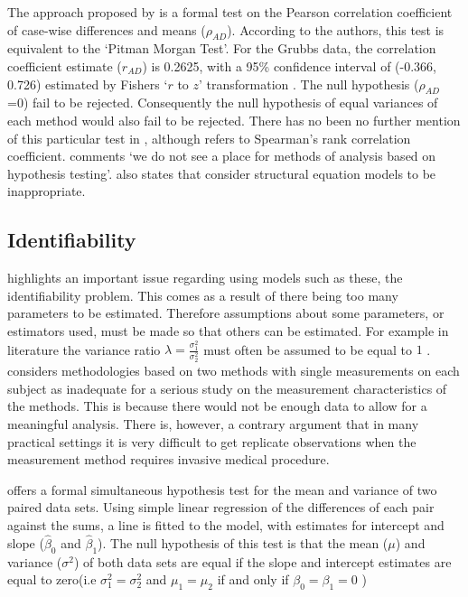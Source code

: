 \documentclass[Chap2main.tex]{subfiles}
\begin{document}
The approach proposed by \citet{BA83} is a formal test on the
Pearson correlation coefficient of case-wise differences and means
($\rho_{AD}$). According to the authors, this test is equivalent
to the `Pitman Morgan Test'. For the Grubbs data, the correlation
coefficient estimate ($r_{AD}$) is 0.2625, with a 95\% confidence
interval of (-0.366, 0.726) estimated by Fishers `$r$ to $z$'
transformation \citep*{Cohen}. The null hypothesis ($\rho_{AD}$ =0)
fail to be rejected. Consequently the null hypothesis of equal
variances of each method would also fail to be rejected. There has
no been no further mention of this particular test in
\citet{BA86}, although \citet{BA99} refers to Spearman's rank
correlation coefficient. \citet{BA99} comments `we do not see a
place for methods of analysis based on hypothesis testing'.
\citet{BA99} also states that consider structural equation models
to be inappropriate.

\subsection{Identifiability}
\citet{DunnSEME} highlights an important issue regarding using
models such as these, the identifiability problem. This comes as a
result of there being too many parameters to be estimated.
Therefore assumptions about some parameters, or estimators used,
must be made so that others can be estimated. For example in literature the variance
ratio $\lambda=\frac{\sigma^{2}_{1}}{\sigma^{2}_{2}}$
must often be assumed to be equal to $1$ \citep{linnet98}.\citet{DunnSEME} considers methodologies based on two methods with single measurements on each subject as inadequate for a serious
study on the measurement characteristics of the methods. This is
because there would not be enough data to allow for a meaningful
analysis. There is, however, a contrary argument that in many
practical settings it is very difficult to get replicate
observations when the measurement method requires invasive medical
procedure.

\citet{BB89} offers a formal simultaneous hypothesis test for the
mean and variance of two paired data sets. Using simple linear
regression of the differences of each pair against the sums, a
line is fitted to the model, with estimates for intercept and
slope ($\hat{\beta}_{0}$ and $\hat{\beta}_{1}$). The null
hypothesis of this test is that the mean ($\mu$) and variance
($\sigma^{2}$) of both data sets are equal if the slope and
intercept estimates are equal to zero(i.e $\sigma^{2}_{1} =
\sigma^{2}_{2}$ and $\mu_{1}=\mu_{2}$ if and only if $\beta_{0}=
\beta_{1}=0$ )
\end{document}
